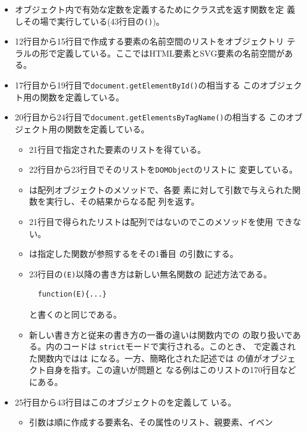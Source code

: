 \begin{itemize}
 \item オブジェクト内で有効な定数を定義するためにクラス式を返す関数を定
       義しその場で実行している(43行目の\texttt{()})。
 \item 12行目から15行目で作成する要素の名前空間のリストをオブジェクトリ
       テラルの形で定義している。ここではHTML要素とSVG要素の名前空間があ
       る。
 \item 17行目から19行目で\texttt{document.getElementById()}の相当する
       このオブジェクト用の関数を定義している。
 \item 20行目から24行目で\texttt{document.getElementsByTagName()}の相当する
       このオブジェクト用の関数を定義している。
       \begin{itemize}
        \item 21行目で指定された要素のリストを得ている。
        \item 22行目から23行目でそのリストを\texttt{DOMObject}のリストに
              変更している。
        \item {}は配列オブジェクトのメソッドで、各要
              素に対して引数で与えられた関数を実行し、その結果からなる配
              列を返す。
        \item 21行目で得られたリストは配列ではないのでこのメソッドを使用
              できない。
        \item {}は指定した関数が参照するをその1番目
              の引数にする。
        \item 23行目の\texttt{(E)}以降の書き方は新しい無名関数の
              記述方法である。
\begin{Verbatim}
  function(E){...}
\end{Verbatim}
              と書くのと同じである。
        \item 新しい書き方と従来の書き方の一番の違いは関数内での
              の取り扱いである。内のコードは
              \texttt{strict}モードで実行される。このとき、
              で定義された関数内ではは
              になる。一方、簡略化された記述では
              の値がオブジェクト自身を指す。この違いが問題と
              なる例はこのリストの170行目などにある。
       \end{itemize}
 \item 25行目から43行目はこのオブジェクトのを定義して
       いる。
       \begin{itemize}
        \item 引数は順に作成する要素名、その属性のリスト、親要素、イベン

\end{itemize}
\end{itemize}

